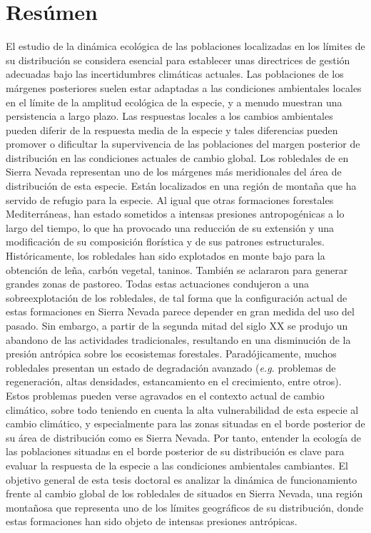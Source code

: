 %
\section*{Resúmen}\label{sec:resumen}
El estudio de la dinámica ecológica de las poblaciones localizadas en los límites de su distribución se considera esencial para establecer unas directrices de gestión adecuadas bajo las incertidumbres climáticas actuales. Las poblaciones de los márgenes posteriores suelen estar adaptadas a las condiciones ambientales locales en el límite de la amplitud ecológica de la especie, y a menudo muestran una persistencia a largo plazo. Las respuestas locales a los cambios ambientales pueden diferir de la respuesta media de la especie y tales diferencias pueden promover o dificultar la supervivencia de las poblaciones del margen posterior de distribución en las condiciones actuales de cambio global. Los robledales de \Qp en Sierra Nevada representan uno de los márgenes más meridionales del  área de distribución de esta especie. Están localizados en una región de montaña que ha servido de refugio para la especie. Al igual que otras formaciones forestales Mediterráneas, han estado sometidos a intensas presiones antropogénicas a lo largo del tiempo, lo que ha provocado una reducción de su extensión y una modificación de su composición florística y de sus patrones estructurales. Históricamente, los robledales han sido explotados en monte bajo para la obtención de leña, carbón vegetal, taninos. También se aclararon para generar grandes zonas de pastoreo. Todas estas actuaciones condujeron a una sobreexplotación de los robledales, de tal forma que la configuración actual de estas formaciones en Sierra Nevada parece depender en gran medida del uso del pasado. Sin embargo, a partir de la segunda mitad del siglo XX se produjo un abandono de las actividades tradicionales, resultando en una disminución de la presión antrópica sobre los ecosistemas forestales. Paradójicamente, muchos robledales presentan un estado de degradación avanzado (\emph{e.g.} problemas de regeneración, altas densidades, estancamiento en el crecimiento, entre otros). Estos problemas pueden verse agravados en el contexto actual de cambio climático, sobre todo teniendo en cuenta la alta vulnerabilidad de esta especie al cambio climático, y especialmente para las zonas situadas en el borde posterior de su área de distribución como es Sierra Nevada. Por tanto, entender la ecología de las poblaciones situadas en el borde posterior de su distribución es clave para evaluar la respuesta de la especie a las condiciones ambientales cambiantes. El objetivo general de esta tesis doctoral es analizar la dinámica de funcionamiento frente al cambio global de los robledales de \Qp situados en Sierra Nevada, una región montañosa que representa uno de los límites geográficos de su distribución, donde estas formaciones han sido objeto de intensas presiones antrópicas. 

